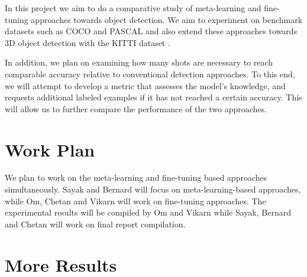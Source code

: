 \documentclass{article}
\begin{document}
{In this project we aim to do a comparative study of meta-learning and fine-tuning approaches 
towards object detection. We aim to experiment on benchmark datasets such as 
COCO \cite{LinMBHPRDZ14} and PASCAL \cite{Everingham10} and also extend these approaches 
towards 3D object detection with the KITTI dataset \cite{Geiger2013IJRR}.

In addition, we plan on examining how many shots are necessary to reach comparable accuracy relative to 
conventional detection approaches. To this end, we will attempt to develop a metric that assesses
the model's knowledge, and requests additional labeled examples if it has not reached a certain accuracy. 
This will allow us to further compare the performance of the two approaches. 

\section{Work Plan}

We plan to work on the meta-learning and fine-tuning based approaches simultaneously. 
Sayak and Bernard will focus on meta-learning-based approaches, while Om, Chetan and Vikarn will work 
on fine-tuning approaches. The experimental results will be compiled by Om and Vikarn while Sayak, 
Bernard and Chetan will work on final report compilation. 
}
\fi 



\appendix 
\section{More Results}





















\end{document}
